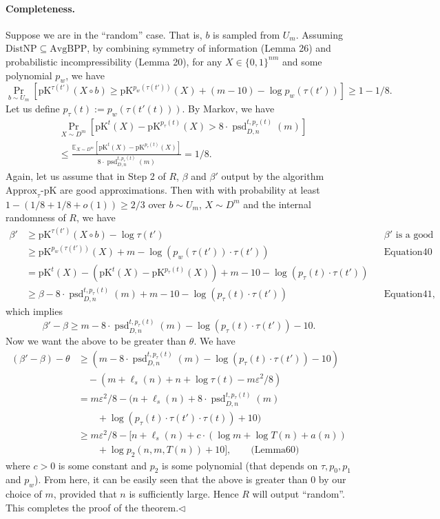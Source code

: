 \documentclass[10pt,a4paper]{article}
\begin{document}
\paragraph{Completeness.} Suppose we are in the ``random'' case. That is, $b$ is sampled from $U_m$. Assuming $\mathrm{DistNP}\subseteq\mathrm{AvgBPP}$, by combining symmetry of information (Lemma 26) and probabilistic incompressibility (Lemma 20), for any $X\in\{0,1\}^{nm}$ and some polynomial $p_w$, we have
\[\Pr_{b\sim U_m}[\mathrm{pK}^{\tau(t')}(X\circ b)\geq\mathrm{pK}^{p_w(\tau(t'))}(X)+(m-10)-\log p_w(\tau(t'))]\geq1-1/8.\tag{40}\]
Let us define $p_\tau(t):=p_w(\tau(t'(t)))$. By Markov, we have
\begin{align*}
&\Pr_{X\sim D^m}[\mathrm{pK}^t(X)-\mathrm{pK}^{p_\tau(t)}(X)>8\cdot\operatorname{psd}_{D,n}^{t,p_\tau(t)}(m)]\\
&\leq\frac{\mathbb E_{X\sim D^m}[\mathrm{pK}^t(X)-\mathrm{pK}^{p_\tau(t)}(X)]}{8\cdot\operatorname{psd}_{D,n}^{t,p_\tau(t)}(m)}=1/8.\tag{41}
\end{align*}
Again, let us assume that in Step 2 of $R$, $\beta$ and $\beta'$ output by the algorithm $\mathrm{Approx}_\tau\text{-}\mathrm{pK}$ are good approximations. Then with with probability at least $1-(1/8+1/8+o(1))\geq2/3$ over $b\sim U_m$, $X\sim D^m$ and the internal randomness of $R$, we have
\begin{align*}
\beta'&\geq\mathrm{pK}^{\tau(t')}(X\circ b)-\log\tau(t')&&\beta'\text{ is a good approximation}\\
&\geq\mathrm{pK}^{p_w(\tau(t'))}(X)+m-\log(p_w(\tau(t'))\cdot\tau(t'))&&\text{Equation40}\\
&=\mathrm{pK}^t(X)-(\mathrm{pK}^t(X)-\mathrm{pK}^{p_\tau(t)}(X))+m-10-\log(p_\tau(t)\cdot\tau(t'))\\
&\geq\beta-8\cdot\operatorname{psd}_{D,n}^{t,p_\tau(t)}(m)+m-10-\log(p_\tau(t)\cdot\tau(t'))&&\text{Equation41},
\end{align*}
which implies
\[\beta'-\beta\geq m-8\cdot\operatorname{psd}_{D,n}^{t,p_\tau(t)}(m)-\log(p_\tau(t)\cdot\tau(t'))-10.\]
Now we want the above to be greater than $\theta$. We have
\begin{align*}
(\beta'-\beta)-\theta
&\geq(m-8\cdot\operatorname{psd}_{D,n}^{t,p_\tau(t)}(m)-\log(p_\tau(t)\cdot\tau(t'))-10)\\
&\quad-(m+\ell_s(n)+n+\log\tau(t)-m\varepsilon^2/8)\\
&=m\varepsilon^2/8-(n+\ell_s(n)+8\cdot\operatorname{psd}_{D,n}^{t,p_\tau(t)}(m)\\
&\qquad+\log(p_\tau(t)\cdot\tau(t')\cdot\tau(t))+10)\\
&\geq m\varepsilon^2/8-[n+\ell_s(n)+c\cdot(\log m+\log T(n)+a(n))\\
&\qquad+\log p_2(n,m,T(n))+10],\qquad\text{(Lemma60)}
\end{align*}
where $c>0$ is some constant and $p_2$ is some polynomial (that depends on $\tau,p_0,p_1$ and $p_w$). From here, it can be easily seen that the above is greater than $0$ by our choice of $m$, provided that $n$ is sufficiently large. Hence $R$ will output ``random''. This completes the proof of the theorem.\hfill$\triangleleft$
\end{document}
